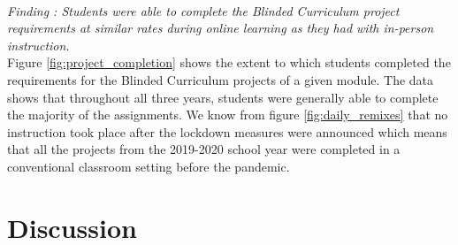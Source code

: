 \documentclass[sigconf,manuscript,review,anonymous]{acmart} %
\def\ts{TIPP\&SEE}
\newcommand{\Scratchencore}[0]{Blinded Curriculum}
\begin{document}
\\
\textit{Finding : Students were able to complete the \Scratchencore{}
project requirements at similar rates during online learning as they had with in-person instruction.} 
\\
Figure \ref{fig:project_completion} shows the extent to which students completed the requirements for the
\Scratchencore{} projects of a given module. The data shows that throughout all three years, students were generally able to complete the majority of the assignments. We know from figure \ref{fig:daily_remixes} that no instruction took place after the lockdown measures were announced which means that all the projects from the 2019-2020 school year were completed in a conventional classroom setting before the pandemic.

\section{Discussion}


\end{document}
